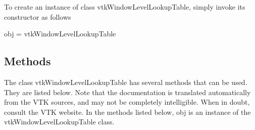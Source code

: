 To create an instance of class vtk\-Window\-Level\-Lookup\-Table, simply invoke its constructor as follows \begin{DoxyVerb}  obj = vtkWindowLevelLookupTable
\end{DoxyVerb}
 \hypertarget{vtkwidgets_vtkxyplotwidget_Methods}{}\subsection{Methods}\label{vtkwidgets_vtkxyplotwidget_Methods}
The class vtk\-Window\-Level\-Lookup\-Table has several methods that can be used. They are listed below. Note that the documentation is translated automatically from the V\-T\-K sources, and may not be completely intelligible. When in doubt, consult the V\-T\-K website. In the methods listed below, {\ttfamily obj} is an instance of the vtk\-Window\-Level\-Lookup\-Table class. 
